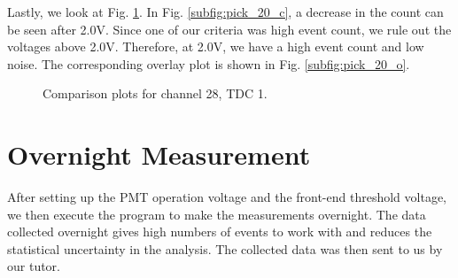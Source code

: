 \documentclass[a4paper]{report}
\numberwithin{equation}{section}
\begin{document}
Lastly, we look at Fig. \ref{fig:pick_20}. In Fig. \ref{subfig:pick_20_c}, a decrease in the count can be seen after 2.0V. Since one of our criteria was high event count, we rule out the voltages above 2.0V. Therefore, at 2.0V, we have a high event count and low noise. The corresponding overlay plot is shown in Fig. \ref{subfig:pick_20_o}. 

\begin{figure}[htb]
	\centering
	\quad
	\centering
	\caption{Comparison plots for channel 28, TDC 1.}
	\label{fig:pick_20}
\end{figure}


\section{Overnight Measurement}

After setting up the PMT operation voltage and the front-end threshold voltage, we then execute the program to make the measurements overnight. The data collected overnight gives high numbers of events to work with and reduces the statistical uncertainty in the analysis. The collected data was then sent to us by our tutor. 


\end{document}
